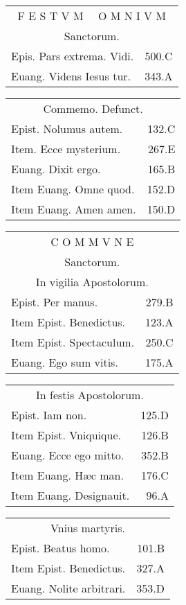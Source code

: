 \documentclass[a5paper,10pt]{book}
\def\ae{æ}
\begin{document}
\begin{multicols}{2}
\begin{tabular}{l r}
\multicolumn{2}{c}{\color{red} \large F E S T V M \ \ O M N I V M}\\
\multicolumn{2}{c}{\color{red} Sanctorum.}\\
Epis. Pars extrema. Vidi. & 500.C\\
Euang. Videns Iesus tur. & 343.A\\
\end{tabular}
\begin{tabular}{l r}
\multicolumn{2}{c}{\color{red} Commemo. Defunct.}\\
Epist. Nolumus autem. & 132.C\\
Item. Ecce mysterium. & 267.E\\
Euang. Dixit ergo. & 165.B\\
Item Euang. Omne quod. & 152.D\\
Item Euang. Amen amen. & 150.D\\
\end{tabular}
\begin{tabular}{l r}
\multicolumn{2}{c}{\color{red} \large C O M M V N E}\\
\multicolumn{2}{c}{\color{red} Sanctorum.}\\
\multicolumn{2}{c}{\color{red} In vigilia Apostolorum.}\\
Epist. Per manus. & 279.B\\
Item Epist. Benedictus. & 123.A\\
Item Epist. Spectaculum. & 250.C\\
Euang. Ego sum vitis. & 175.A\\
\end{tabular}
\begin{tabular}{l r}
\multicolumn{2}{c}{\color{red} In festis Apostolorum.}\\
Epist. Iam non. & 125.D\\
Item Epist. Vniquique. & 126.B\\
Euang. Ecce ego mitto. & 352.B\\
Item Euang. H\ae c man. & 176.C\\
Item Euang. Designauit. & 96.A\\
\end{tabular}
\begin{tabular}{l r}
\multicolumn{2}{c}{\color{red} Vnius martyris.}\\
Epist. Beatus homo. & 101.B\\
Item Epist. Benedictus. & 327.A\\
Euang. Nolite arbitrari. & 353.D\\

\end{tabular}
\end{multicols}
\end{document}
